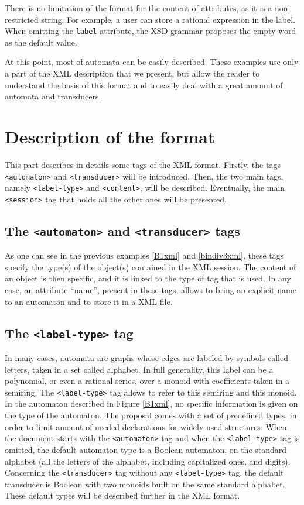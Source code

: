 \documentclass[a4paper]{llncs}
\def\typetag{\texttt{<label-type>}}
\def\contenttag{\texttt{<content>}}
\def\sessiontag{\texttt{<session>}}
\def\automatontag{\texttt{<automaton>}}
\def\transducertag{\texttt{<transducer>}}
\def\labelattr{\texttt{label}}
\begin{document}
There is no limitation of the format for the content
of attributes, as it is a non-restricted string. For example, a user
can store a rational expression in the label.
When omitting the \labelattr{} attribute, the XSD grammar proposes the empty
word as the default value.

At this point, most of automata can be easily described. These examples use
only a part of the XML description that we present, but allow the reader to
understand the basis of this format and to easily deal with a great amount of
automata and transducers.

\section{Description of the format}

This part describes in details some tags of the XML format.
Firstly, the tags \automatontag{} and \transducertag{} will be introduced.
Then, the two main tags, namely \typetag{} and \contenttag{}, will be described.
Eventually, the main \sessiontag{} tag that holds all the other ones will be
presented.

\subsection{The \automatontag{} and \transducertag{} tags}

As one can see in the previous examples \ref{B1xml} and \ref{bindiv3xml}, these
tags specify the type(s) of the object(s) contained in the XML session. The content
of an object is then specific, and it is linked to the type of tag that is used.
In any case, an attribute ``name'', present in these tags, allows to bring an
explicit name to an automaton and to store it in a XML file.

\subsection{The \typetag{} tag}

In many cases, automata are graphs whose edges are labeled by symbols called
letters, taken in a set called alphabet. In full generality, this label can be
a polynomial, or even a rational series, over a monoid with coefficients taken in a
semiring. The \typetag{} tag allows to refer to this semiring and this monoid.\\

In the automaton described in Figure \ref{B1xml}, no specific
information is given on the type of the automaton. The proposal comes
with a set of predefined types, in order to limit amount of needed
declarations for widely used structures. When the document starts with
the \automatontag{} tag and when the \typetag{} tag is omitted,
the default automaton type is a Boolean automaton, on the standard
alphabet (all the letters of the alphabet, including capitalized ones, and digits).
Concerning the \transducertag{} tag without any \typetag{} tag, the default
transducer is Boolean with two monoids built on the same standard alphabet.
These default types will be described further in the XML format.
\end{document}
